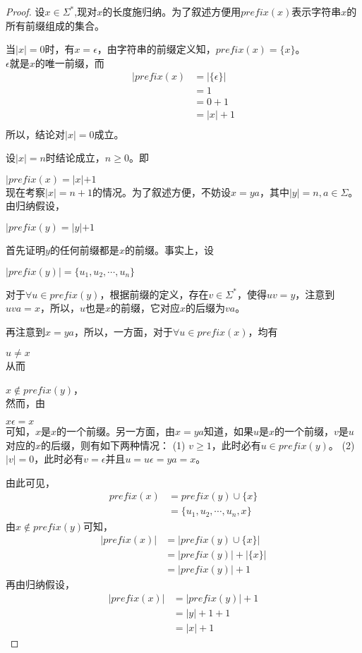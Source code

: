 \begin{solution}
	\begin{proof}
		设$x\in\Sigma^\ast$,现对$x$的长度施归纳。为了叙述方便用$prefix(x)$表示字符串$x$的所有前缀组成的集合。
		
		当$|x|=0$时，有$x=\epsilon$，由字符串的前缀定义知，$prefix(x)=\{x\}$。\\
		$\epsilon$就是$x$的唯一前缀，而
		\begin{align*}
		|prefix(x) &=|\{\epsilon\}| \\
		           &=1  \\
		           &=0+1 \\
		           &=|x|+1 \\
		\end{align*}
		所以，结论对$|x|=0$成立。
		
		设$|x|=n$时结论成立，$n\ge 0$。即

		$|prefix(x)=|x|+1$\\ 
		现在考察$|x|=n+1$的情况。为了叙述方便，不妨设$x=ya$，其中$|y|=n,a\in\Sigma$。由归纳假设，
		
		$|prefix(y)=|y|+1$ 
		
		首先证明$y$的任何前缀都是$x$的前缀。事实上，设
		
		$|prefix(y)|=\{u_1,u_2,\cdots,u_n\}$	
		
		对于$\forall u\in prefix(y)$，根据前缀的定义，存在$v\in\Sigma^\ast$，使得$uv=y$，注意到$uva=x$，所以，$u$也是$x$的前缀，它对应$x$的后缀为$va$。
		
		再注意到$x=ya$，所以，一方面，对于$\forall u\in prefix(x)$，均有
		
		$u\ne x$\\
		从而
		
		$x\notin prefix(y)$，\\
		然而，由
		
		$x\epsilon=x$\\
		可知，$x$是$x$的一个前缀。另一方面，由$x=ya$知道，如果$u$是$x$的一个前缀，$v$是$u$对应的$x$的后缀，则有如下两种情况：
		\subitem(1) $v\ge 1$，此时必有$u\in prefix(y)$。
		\subitem(2) $|v|=0$，此时必有$v=\epsilon$并且$u=u\epsilon=ya=x$。
		
		\noindent 由此可见，
		\begin{align*}
			prefix(x)&=prefix(y)\cup\{x\} \\
			&=\{u_1,u_2,\cdots,u_n,x\}
		\end{align*}
		由$x\notin prefix(y)$可知，
		\begin{align*}
		|prefix(x)| &= |prefix(y)\cup\{x\}| \\
		&=|prefix(y)|+|\{x\}| \\
		&=|prefix(y)|+1
		\end{align*}
		再由归纳假设，	
		\begin{align*}
			|prefix(x)| &= |prefix(y)|+1 \\
			&=|y|+1+1 \\
			&=|x|+1
		\end{align*}
		

\end{proof}
\end{solution}
